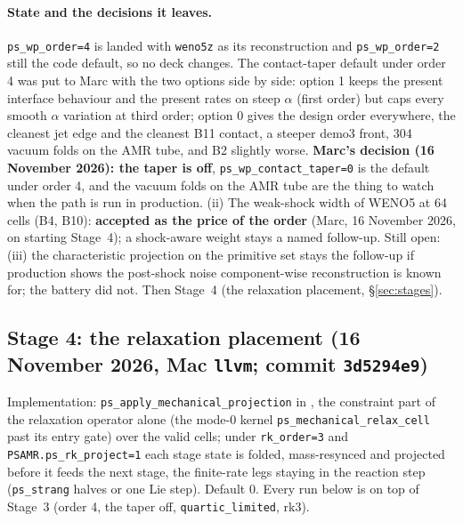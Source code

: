 \documentclass[11pt,a4paper]{article}
\newcommand{\code}[1]{\texttt{\small #1}}
\begin{document}
\paragraph{State and the decisions it leaves.}  \code{ps\_wp\_order=4} is
landed with \code{weno5z} as its reconstruction and \code{ps\_wp\_order=2}
still the code default, so no deck changes.  The contact-taper default
under order 4 was put to Marc with the two options side by side: option
1 keeps the present interface behaviour and the present rates on steep
$\alpha$ (first order) but caps every smooth $\alpha$ variation at third
order; option 0 gives the design order everywhere, the cleanest jet edge
and the cleanest B11 contact, a steeper demo3 front, 304 vacuum folds on
the AMR tube, and B2 slightly worse.  \textbf{Marc's decision (16
November 2026): the taper is off}, \code{ps\_wp\_contact\_taper=0} is
the default under order 4, and the vacuum folds on the AMR tube are the
thing to watch when the path is run in production.  (ii) The weak-shock
width of WENO5 at 64 cells (B4, B10): \textbf{accepted as the price of the
order} (Marc, 16 November 2026, on starting Stage~4); a shock-aware
weight stays a named follow-up.  Still open: (iii) the
characteristic projection on the primitive set stays the follow-up if
production shows the post-shock noise component-wise reconstruction is
known for; the battery did not.  Then Stage~4 (the relaxation placement,
\S\ref{sec:stages}).


\subsection{Stage 4: the relaxation placement (16 November 2026, Mac \code{llvm}; commit \code{3d5294e9})}
\label{sec:stage4}

Implementation: \code{ps\_apply\_mechanical\_projection} in
, the constraint part of the relaxation operator alone
(the mode-0 kernel \code{ps\_mechanical\_relax\_cell} past its entry
gate) over the valid cells; under \code{rk\_order=3} and
\code{PSAMR.ps\_rk\_project=1} each stage state is folded, mass-resynced
and projected before it feeds the next stage, the finite-rate legs
staying in the reaction step (\code{ps\_strang} halves or one Lie
step).  Default 0.  Every run below is on top of Stage~3 (order 4, the
taper off, \code{quartic\_limited}, rk3).
\end{document}
